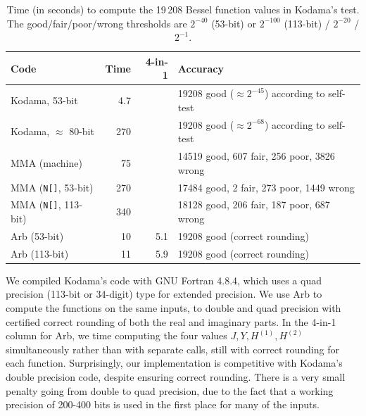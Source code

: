 \documentclass[11pt,a4paper]{article}
\begin{document}
\begin{table}
\renewcommand{\arraystretch}{1.1}
\setlength{\tabcolsep}{.4em}
\begin{center}
\begin{small}
\begin{tabular}{l | r r | l}
Code               & Time  & 4-in-1 &  Accuracy  \\ \hline
Kodama, 53-bit     & 4.7  &   &  19208 good ($\approx 2^{-45}$) according to self-test          \\
Kodama, $\approx$ 80-bit   & 270  &   &  19208 good ($\approx 2^{-68}$) according to self-test          \\ \hline
MMA (machine)            & 75  &   &  14519 good, 607 fair, 256 poor, 3826 wrong \\
MMA (\texttt{N[]}, 53-bit)           & 270   &  &  17484 good, 2 fair,   273 poor, 1449 wrong \\
MMA (\texttt{N[]}, 113-bit)           & 340  &   &  18128 good, 206 fair, 187 poor, 687 wrong \\ \hline
Arb (53-bit)       & 10  & 5.1  &  19208 good (correct rounding) \\
Arb (113-bit)      & 11  & 5.9  &  19208 good (correct rounding) \\
\end{tabular}
\end{small}
\caption{Time (in seconds) to compute the 19\,208 Bessel function values in Kodama's test.
The good/fair/poor/wrong thresholds are $2^{-40}$ (53-bit) or $2^{-100}$ (113-bit) / $2^{-20}$ / $2^{-1}$.}
\label{tab:kodama}
\end{center}
\end{table}

We compiled Kodama's code with GNU Fortran 4.8.4, which uses a quad precision
(113-bit or 34-digit) type for extended precision.
We use Arb to compute the functions on the same
inputs, to double and quad precision
with certified correct rounding of both the real and imaginary parts.
In the 4-in-1 column for Arb, we time
computing the four values $J, Y, H^{(1)}, H^{(2)}$ simultaneously rather than with
separate calls, still with correct rounding for each function.
Surprisingly, our implementation is competitive with Kodama's double
precision code,
despite ensuring correct rounding.
There is a very small penalty going from double to quad precision,
due to the fact that a working precision of 200-400 bits is used
in the first place for many of the inputs.
\end{document}
